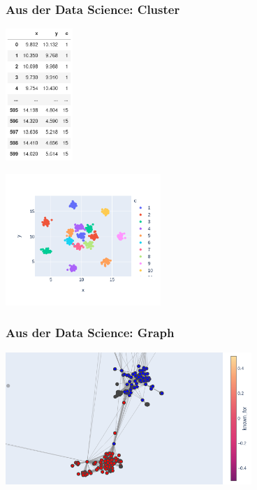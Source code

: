 \begin{frame}
\frametitle{Aus der Data Science: Cluster}

\vfill

\begin{minipage}{0.35\textwidth}
	\begin{center}
		\includegraphics[height=50mm]{fig5/clustering-table.png}
	\end{center}
\end{minipage}%
\begin{minipage}{0.65\textwidth}
	\begin{center}
		\includegraphics[height=50mm, clip, trim=5mm 6mm 0mm 14mm]{fig5/clustering-plot.png}
	\end{center}
\end{minipage}

\vfill
\end{frame}


\begin{frame}
\frametitle{Aus der Data Science: Graph}

\vfill
\begin{center}
	\includegraphics[height=50mm]{fig5/graph.png}
\end{center}
\vfill
\end{frame}



